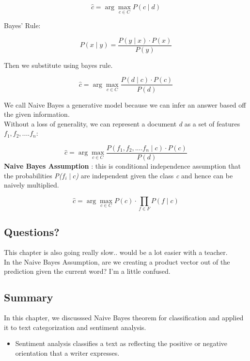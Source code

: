 \documentclass{article}
\begin{document}
\[
    \hat{c} = \arg\max_{c \in C} P(c \mid d)
\]

Bayes' Rule:

\[
    P(x \mid y) = \frac{P(y \mid x) \cdot P(x)}{P(y)}
\]

Then we substitute using bayes rule.

\[
    \hat{c} = \arg\max_{c \in C} \frac{P(d \mid c) \cdot P(c)}{P(d)}
\]

We call Naive Bayes a generative model because we can infer an answer based off the given information.
\\Without a loss of generality, we can represent a document \textit{d} as a set of features $f_1, f_2,.... f_n$:

\[
    \hat{c} = \arg\max_{c \in C} \frac{P(f_1, f_2,....f_n\mid c) \cdot P(c)}{P(d)}
\]
\textbf{Naive Bayes Assumption} : this is conditional independence assumption that the probabilities \textit{P($f_i \mid c$)}
are independent given the class \textit{c} and hence can be naively multiplied.

\[
    \hat{c} = \arg\max_{c \in C} P(c) \cdot \prod_{f \in F} P(f \mid c)
\]

\subsection{Questions?}
This chapter is also going really slow.. would be a lot easier with a teacher.
\\ In the Naive Bayes Assumption, are we creating a product vector out of the prediction given the current word? I'm a little confused.

\subsection{Summary}
In this chapter, we discusssed Naive Bayes theorem for classification and applied it to text categorization and sentiment analysis.
\begin{itemize}
    \item Sentiment analysis classifies a text as reflecting the positive or negative orientation that a writer expresses.
\end{itemize}
\end{document}
